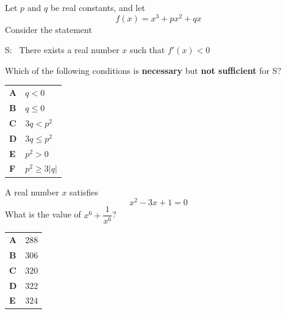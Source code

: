 \documentclass[11pt,a4paper]{article}
\begin{document}
\begin{enumerate}[label=\textbf{\arabic*.},leftmargin=*,itemsep=0pt,start=18]
\questionitem[Logic]
Let $p$ and $q$ be real constants, and let
\[f(x)=x^3+px^2+qx\] Consider the statement 
\begin{center}
\begin{minipage}{0.82\linewidth}
\centering
S: \, There exists a real number $x$ such that $f'(x)<0$
\end{minipage}
\end{center}
Which of the following conditions is \textbf{necessary} but \textbf{not sufficient} for S?

\par\vspace*{12pt}
\begin{tabularx}{\linewidth}{@{}>{\bfseries}l Y@{}}
A &
$q<0$
\\[0.8em]
B &
$q\le 0$
\\[0.8em]
C &
$3q<p^2$
\\[0.8em]
D &
$3q\le p^2$
\\[0.8em]
E &
$p^2>0$
\\[0.8em]
F &
$p^2\ge 3|q|$
\\
\end{tabularx}
\end{enumerate}
\clearpage
\thispagestyle{djspaper}
\vspace*{8pt}
\begin{enumerate}[label=\textbf{\arabic*.},leftmargin=*,itemsep=0pt,start=19]
\questionitem[Algebra]
A real number $x$ satisfies
\[
x^2-3x+1=0
\]
What is the value of $x^6+\dfrac{1}{x^6}$?

\par\vspace*{12pt}
\begin{tabularx}{\linewidth}{@{}>{\bfseries}l Y@{}}
A &
$288$
\\[0.8em]
B &
$306$
\\[0.8em]
C &
$320$
\\[0.8em]
D &
$322$
\\[0.8em]
E &
$324$
\\
\end{tabularx}
\end{enumerate}
\end{document}
